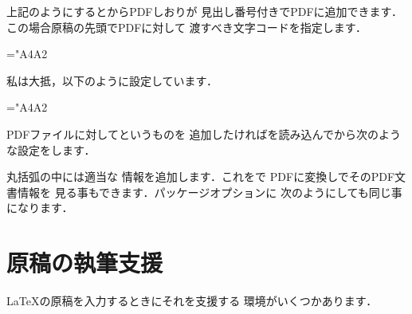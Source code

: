 \begin{InTeX}
\usepackage[dvipdfm,bookmarks=true,%
bookmarksnumbered=true,bookmarkstype=toc]{hyperref}
\end{InTeX}

上記のようにするとからPDFしおりが
見出し番号付きでPDFに追加できます．
この場合原稿の先頭でPDFに対して
渡すべき文字コードを指定します．

\begin{InTeX}
=\euc"A4A2
\else%
\fi
\end{InTeX}

私は大抵，以下のように設定しています．

\begin{InTeX}
=\euc"A4A2
\else%
\fi
\usepackage[dvipdfm,bookmarks=true,%
   bookmarkstype=toc,bookmarksnumbered=false,%
   bookmarksopen=true,colorlinks=true,%
   linkcolor=blue,citecolor=blue,filecolor=blue,%
   menucolor=magenta,pagecolor=blue,urlcolor=blue,%
   backref=page]{hyperref}
\end{InTeX}

PDFファイルに対してというものを%
追加したければを読み込んでから次のような設定をします．

\begin{InTeX}
\end{InTeX}

丸括弧の中には適当な
情報を追加します．これを\prog{\Dvipdfmx}で
PDFに変換しでそのPDF文書情報を
見る事もできます．パッケージオプションに
次のようにしても同じ事になります．

\begin{InTeX}
\usepackage[dvipdfm,pdftitle={主題},%
pdfsubject={副題},pdfauthor={著者},%
pdfkeywords={キーワード}]{hyperref}
\end{InTeX}





\section{原稿の執筆支援}
%
{\LaTeX}の原稿を入力するときにそれを支援する
環境がいくつかあります．

